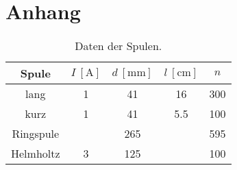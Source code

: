 \section{Anhang}
\label{sec:anhang}
\begin{table}
      \caption{Daten der Spulen.}
      \label{tab:spulen}
      \centering
      \begin{tabular}{c S[table-format=1.0] S[table-format=3.0] S[table-format=2.1] S[table-format=3.0]}
            \toprule
            {Spule}
            & {$I \: [\si{\ampere}]$}
            & {$d \: [\si{\milli\metre}]$}
            & {$l \: [\si{\centi\metre}]$}
            & {$n$} \\
            \midrule
            lang      & 1 &  41 & 16  & 300 \\
            kurz      & 1 &  41 & 5.5 & 100 \\
            Ringspule &   & 265 &     & 595 \\
            Helmholtz & 3 & 125 &     & 100 \\
            \bottomrule
      \end{tabular}
\end{table}
